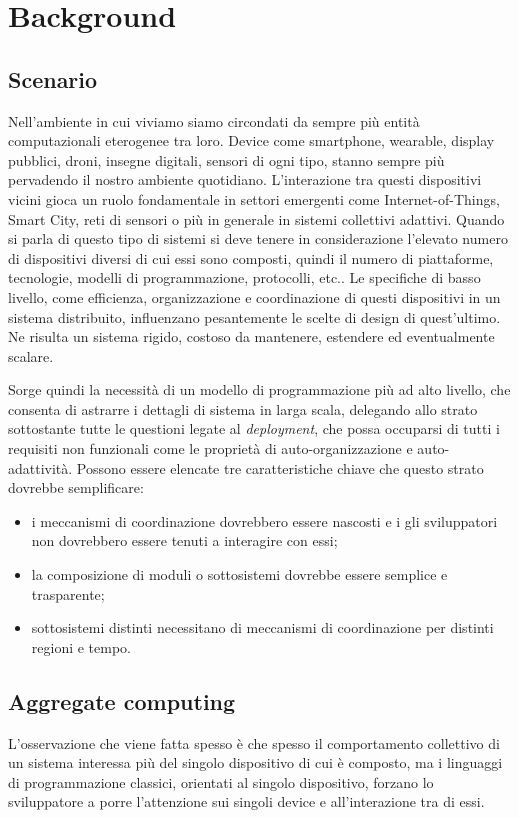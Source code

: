 \chapter{Background}
\section{Scenario}
Nell'ambiente in cui viviamo siamo circondati da sempre più entità
computazionali eterogenee tra loro. Device come smartphone, wearable, display
pubblici, droni, insegne digitali, sensori di ogni tipo, stanno sempre più
pervadendo il nostro ambiente quotidiano. L'interazione tra questi dispositivi
vicini gioca un ruolo fondamentale in settori emergenti come Internet-of-Things,
Smart City, reti di sensori o più in generale in sistemi collettivi
adattivi. Quando si parla di questo tipo di sistemi si deve tenere in
considerazione l'elevato numero di dispositivi diversi di cui essi sono
composti, quindi il numero di piattaforme, tecnologie, modelli di
programmazione, protocolli, etc.. Le specifiche di basso livello, come
efficienza, organizzazione e coordinazione di questi dispositivi in un sistema
distribuito, influenzano pesantemente le scelte di design di quest'ultimo. Ne
risulta un sistema rigido, costoso da mantenere, estendere ed eventualmente
scalare.

Sorge quindi la necessità di un modello di programmazione più ad alto livello,
che consenta di astrarre i dettagli di sistema in larga scala, delegando allo
strato sottostante tutte le questioni legate al \textit{deployment}, che possa
occuparsi di tutti i requisiti non funzionali come le proprietà di
auto-organizzazione e auto-adattività. Possono essere elencate tre
caratteristiche chiave\cite{DBLP:journals/computer/BealPV15} che questo strato dovrebbe semplificare:
\begin{itemize}
\item i meccanismi di coordinazione dovrebbero essere nascosti e i gli
  sviluppatori non dovrebbero essere tenuti a interagire con essi;
\item la composizione di moduli o sottosistemi dovrebbe essere semplice e
  trasparente;
\item sottosistemi distinti necessitano di meccanismi di coordinazione per distinti
regioni e tempo.
\end{itemize}


\section{Aggregate computing}
L'osservazione che viene fatta spesso è che spesso il comportamento collettivo
di un sistema interessa più del singolo dispositivo di cui è composto, ma i
linguaggi di programmazione classici, orientati al singolo dispositivo, forzano
lo sviluppatore a porre l'attenzione sui singoli device e all'interazione tra di
essi.

